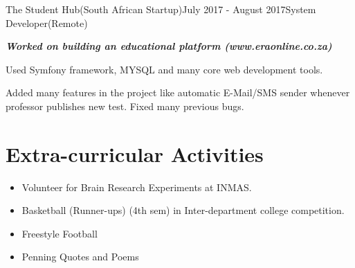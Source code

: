 \documentclass[letterpaper]{twentysecondcv} %
\begin{document}

\begin{rSubsection}{The Student Hub(South African Startup)}{July 2017 - August 2017}{System Developer(Remote)}{}
	\item {\em \bf Worked on building an educational platform (www.eraonline.co.za)}
	\item Used Symfony framework, MYSQL and many core web development tools.
	\item Added many features in the project like automatic E-Mail/SMS sender
	whenever professor publishes new test. Fixed many previous bugs.
\end{rSubsection}

\section{Extra-curricular Activities}
\begin{itemize}
	\item Volunteer for Brain Research Experiments at INMAS.
	\item Basketball (Runner-ups) (4th sem) in Inter-department college competition.
	\item Freestyle Football
	\item Penning Quotes and Poems
\end{itemize}
\end{document}
